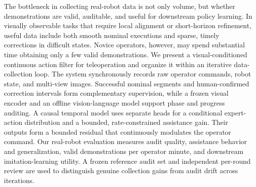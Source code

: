 The bottleneck in collecting real-robot data is not only volume, but whether
demonstrations are valid, auditable, and useful for downstream policy learning.
In visually observable tasks that require local alignment or short-horizon
refinement, useful data include both smooth nominal executions and sparse,
timely corrections in difficult states. Novice operators, however, may spend
substantial time obtaining only a few valid demonstrations. We present a
visual-conditioned continuous action filter for teleoperation and organize it
within an iterative data-collection loop. The system synchronously records raw
operator commands, robot state, and multi-view images. Successful nominal
segments and human-confirmed correction intervals form complementary
supervision, while a frozen visual encoder and an offline vision-language model
support phase and progress auditing. A causal temporal model uses separate
heads for a conditional expert-action distribution and a bounded,
rate-constrained assistance gain. Their outputs form a bounded residual that
continuously modulates the operator command. Our real-robot evaluation measures
audit quality, assistance behavior and generalization, valid demonstrations per
operator minute, and downstream imitation-learning utility. A frozen reference
audit set and independent per-round review are used to distinguish genuine
collection gains from audit drift across iterations.
